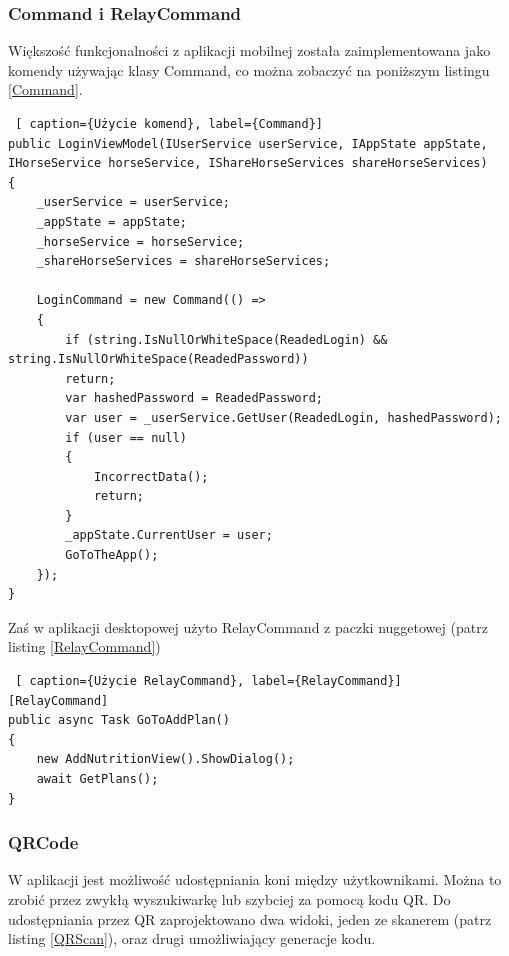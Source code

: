 \documentclass[12pt,oneside]{report}
\begin{document}
\subsubsection{Command i RelayCommand}
Większość funkcjonalności z aplikacji mobilnej została zaimplementowana jako komendy używając klasy Command, co można zobaczyć na poniższym listingu \ref{Command}.
\begin{lstlisting} [ caption={Użycie komend}, label={Command}]	
public LoginViewModel(IUserService userService, IAppState appState, IHorseService horseService, IShareHorseServices shareHorseServices)
{
	_userService = userService;
	_appState = appState;
	_horseService = horseService;
	_shareHorseServices = shareHorseServices;
	
	LoginCommand = new Command(() =>
	{
		if (string.IsNullOrWhiteSpace(ReadedLogin) && string.IsNullOrWhiteSpace(ReadedPassword))
		return;
		var hashedPassword = ReadedPassword;
		var user = _userService.GetUser(ReadedLogin, hashedPassword);
		if (user == null)
		{
			IncorrectData();
			return;
		}
		_appState.CurrentUser = user;
		GoToTheApp();
	});
}
\end{lstlisting}
Zaś w aplikacji desktopowej użyto RelayCommand z paczki nuggetowej (patrz listing \ref{RelayCommand})
\begin{lstlisting} [ caption={Użycie RelayCommand}, label={RelayCommand}]	
[RelayCommand]
public async Task GoToAddPlan()
{
	new AddNutritionView().ShowDialog();
	await GetPlans();
}
\end{lstlisting}
\subsubsection{QRCode}
W aplikacji jest możliwość udostępniania koni między użytkownikami. Można to zrobić przez zwykłą wyszukiwarkę lub szybciej za pomocą kodu QR. Do udostępniania przez QR zaprojektowano dwa widoki, jeden ze skanerem (patrz listing \ref{QRScan}), oraz drugi umożliwiający generacje kodu. 
\end{document}
